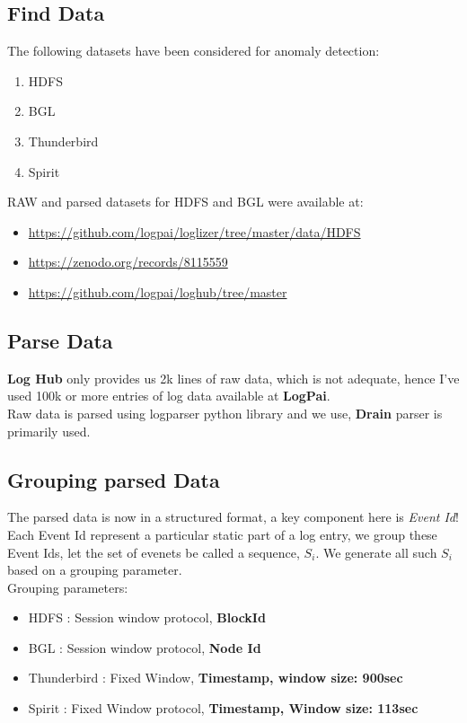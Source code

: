\documentclass[titlepage]{article}
\begin{document}
\subsection{Find Data}
The following datasets have been considered for anomaly detection:
\begin{enumerate}
\item HDFS
\item BGL
\item Thunderbird
\item Spirit
\end{enumerate}
RAW and parsed datasets for HDFS and BGL were available at:
\begin{itemize}
    \item \href{https://github.com/logpai/loglizer/tree/master/data/HDFS}{https://github.com/logpai/loglizer/tree/master/data/HDFS}
    \item \href{https://zenodo.org/records/8115559}{https://zenodo.org/records/8115559}
    \item \href{https://github.com/logpai/loghub/tree/master}{https://github.com/logpai/loghub/tree/master}
\end{itemize}

\subsection{Parse Data}
\textbf{Log Hub} only provides us 2k lines of raw data, which is not adequate, hence I've used 100k or more entries of log data available at \textbf{LogPai}. \\
Raw data is parsed using logparser python library and we use, \textbf{Drain} parser is primarily used. \\
\subsection{Grouping parsed Data}
The parsed data is now in a structured format, a key component here is \textit{Event Id}! Each Event Id represent a particular static part of a log entry, we group these Event Ids, let the set of evenets be called a sequence, $S_i$. We generate all such $S_i$ based on a grouping parameter.\\
Grouping parameters: \\
\begin{itemize}
    \item HDFS : Session window protocol, \textbf{BlockId}
    \item BGL : Session window protocol, \textbf{Node Id}
    \item Thunderbird : Fixed Window, \textbf{Timestamp, window size: 900sec}
    \item Spirit : Fixed Window protocol, \textbf{Timestamp, Window size: 113sec}
\end{itemize}
\end{document}
